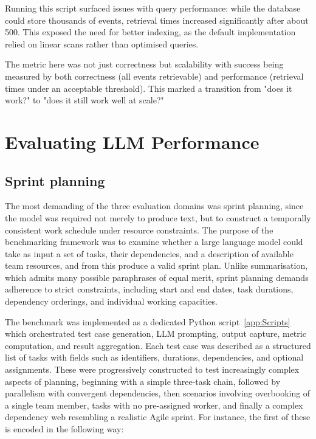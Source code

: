 \documentclass{report}
\begin{document}
Running this script surfaced issues with query performance: while the database could store thousands of events, retrieval times increased significantly after about 500.
This exposed the need for better indexing, as the default implementation relied on linear scans rather than optimised queries.

The metric here was not just correctness but scalability with success being measured by both correctness (all events retrievable) and performance (retrieval times under an acceptable threshold). 
This marked a transition from "does it work?" to "does it still work well at scale?"

\section{Evaluating LLM Performance}
\subsection{Sprint planning}

The most demanding of the three evaluation domains was sprint planning, since the model was required not merely to produce text, but to construct a temporally consistent work schedule under resource constraints. 
The purpose of the benchmarking framework was to examine whether a large language model could take as input a set of tasks, their dependencies, and a description of available team resources, and from this produce a valid sprint plan. 
Unlike summarisation, which admits many possible paraphrases of equal merit, sprint planning demands adherence to strict constraints, including start and end dates, task durations, dependency orderings, and individual working capacities.

The benchmark was implemented as a dedicated Python script~\ref{app:Scripts} which orchestrated test case generation, LLM prompting, output capture, metric computation, and result aggregation. 
Each test case was described as a structured list of tasks with fields such as identifiers, durations, dependencies, and optional assignments. 
These were progressively constructed to test increasingly complex aspects of planning, beginning with a simple three-task chain, followed by parallelism with convergent dependencies, then scenarios involving overbooking of a single team member, tasks with no pre-assigned worker, and finally a complex dependency web resembling a realistic Agile sprint. 
For instance, the first of these is encoded in the following way:
\end{document}
